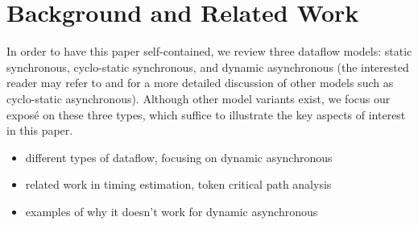 \section{Background and Related Work}\label{sec:back}

In order to have this paper self-contained, we review three dataflow models: static synchronous, cyclo-static synchronous, and dynamic asynchronous (the interested reader may refer to \cite{7094787} and \cite{Bouakaz:2017:SPD:3029795.2999539} for a more detailed discussion of other models such as cyclo-static asynchronous). Although other model variants exist, we focus our expos\'{e} on these three types, which suffice to illustrate the key aspects of interest in this paper. 




\begin{itemize}
\item different types of dataflow, focusing on dynamic asynchronous
\item related work in timing estimation, token critical path analysis
\item examples of why it doesn't work for dynamic asynchronous
\end{itemize}


